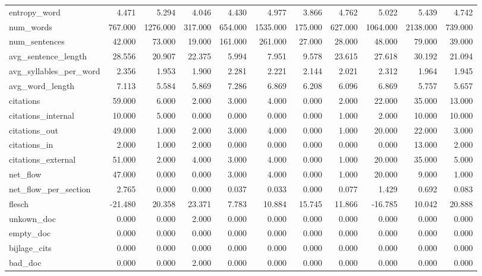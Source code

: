 \begin{tabular}{lrrrrrrrrrr}
\cline{1-11}
entropy\_word & 4.471 & 5.294 & 4.046 & 4.430 & 4.977 & 3.866 & 4.762 & 5.022 & 5.439 & 4.742 \\
\cline{1-11}
num\_words & 767.000 & 1276.000 & 317.000 & 654.000 & 1535.000 & 175.000 & 627.000 & 1064.000 & 2138.000 & 739.000 \\
\cline{1-11}
num\_sentences & 42.000 & 73.000 & 19.000 & 161.000 & 261.000 & 27.000 & 28.000 & 48.000 & 79.000 & 39.000 \\
\cline{1-11}
avg\_sentence\_length & 28.556 & 20.907 & 22.375 & 5.994 & 7.951 & 9.578 & 23.615 & 27.618 & 30.192 & 21.094 \\
\cline{1-11}
avg\_syllables\_per\_word & 2.356 & 1.953 & 1.900 & 2.281 & 2.221 & 2.144 & 2.021 & 2.312 & 1.964 & 1.945 \\
\cline{1-11}
avg\_word\_length & 7.113 & 5.584 & 5.869 & 7.286 & 6.869 & 6.208 & 6.096 & 6.869 & 5.757 & 5.657 \\
\cline{1-11}
citations & 59.000 & 6.000 & 2.000 & 3.000 & 4.000 & 0.000 & 2.000 & 22.000 & 35.000 & 13.000 \\
\cline{1-11}
citations\_internal & 10.000 & 5.000 & 0.000 & 0.000 & 0.000 & 0.000 & 1.000 & 2.000 & 10.000 & 10.000 \\
\cline{1-11}
citations\_out & 49.000 & 1.000 & 2.000 & 3.000 & 4.000 & 0.000 & 1.000 & 20.000 & 22.000 & 3.000 \\
\cline{1-11}
citations\_in & 2.000 & 1.000 & 2.000 & 0.000 & 0.000 & 0.000 & 0.000 & 0.000 & 13.000 & 2.000 \\
\cline{1-11}
citations\_external & 51.000 & 2.000 & 4.000 & 3.000 & 4.000 & 0.000 & 1.000 & 20.000 & 35.000 & 5.000 \\
\cline{1-11}
net\_flow & 47.000 & 0.000 & 0.000 & 3.000 & 4.000 & 0.000 & 1.000 & 20.000 & 9.000 & 1.000 \\
\cline{1-11}
net\_flow\_per\_section & 2.765 & 0.000 & 0.000 & 0.037 & 0.033 & 0.000 & 0.077 & 1.429 & 0.692 & 0.083 \\
\cline{1-11}
flesch & -21.480 & 20.358 & 23.371 & 7.783 & 10.884 & 15.745 & 11.866 & -16.785 & 10.042 & 20.888 \\
\cline{1-11}
unkown\_doc & 0.000 & 0.000 & 2.000 & 0.000 & 0.000 & 0.000 & 0.000 & 0.000 & 0.000 & 0.000 \\
\cline{1-11}
empty\_doc & 0.000 & 0.000 & 0.000 & 0.000 & 0.000 & 0.000 & 0.000 & 0.000 & 0.000 & 0.000 \\
\cline{1-11}
bijlage\_cits & 0.000 & 0.000 & 0.000 & 0.000 & 0.000 & 0.000 & 0.000 & 0.000 & 0.000 & 0.000 \\
\cline{1-11}
bad\_doc & 0.000 & 0.000 & 2.000 & 0.000 & 0.000 & 0.000 & 0.000 & 0.000 & 0.000 & 0.000 \\
\cline{1-11}
\bottomrule
\end{tabular}
